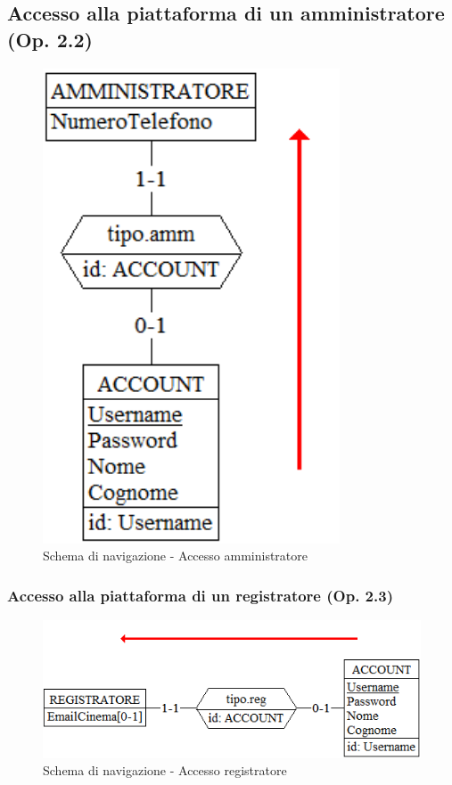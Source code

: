 \documentclass[a4paper,12pt]{report}
\begin{document}
	\subsection{Accesso alla piattaforma di un amministratore (Op. 2.2)}
	\begin{figure}[H]
		\centering
		\includegraphics[width=250pt]{ER/navigazione/accessoamm.png}
		\caption{Schema di navigazione - Accesso amministratore}
	\end{figure}
	
	\subsubsection{Accesso alla piattaforma di un registratore (Op. 2.3)}
	\begin{figure}[H]
		\centering
		\includegraphics{ER/navigazione/accessoreg.png}
		\caption{Schema di navigazione - Accesso registratore}
	\end{figure}
	
\end{document}

